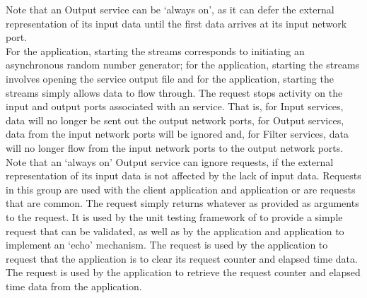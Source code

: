 Note that an Output service can be `always on', as it can defer the external
representation of its input data until the first data arrives at its input \yarp{}
network port.\\

For the  application, starting the
streams corresponds to initiating an asynchronous random number generator; for the
 application, starting the streams
involves opening the service output file and for the
 application, starting the streams
simply allows data to flow through.
The  request stops activity on
the input and output ports associated with an  service.
That is, for Input services, data will no longer be sent out the output \yarp{} network
ports, for Output services, data from the input \yarp{} network ports will be ignored and,
for Filter services, data will no longer flow from the input \yarp{} network ports to the
output \yarp{} network ports.\\

Note that an `always on' Output service can ignore
 requests, if the external
representation of its input data is not affected by the lack of input data.
\secondaryEnd{}
Requests in this group are used with the  client
application and  application or are requests that
are common.
The  request simply returns whatever
as provided as arguments to the request.
It is used by the unit testing framework of \mplusm{} to provide a simple request that
can be validated, as well as by the  application
and  application to implement an `echo' mechanism.
The  request is used by the
 application to request that the
 application is to clear its request counter and
elapsed time data.
The  request is used by the
 application to retrieve the request counter and
elapsed time data from the  application.
\secondaryEnd{}
\primaryEnd{}
